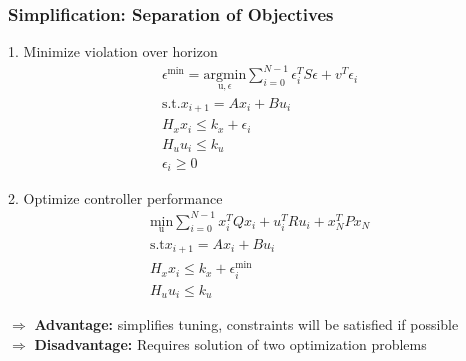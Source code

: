 \subsubsection{Simplification: Separation of Objectives}
\begin{minipage}{0.49\linewidth}
1. Minimize violation over horizon
\begin{gather*}
\epsilon^{\mathrm{min}}= \underset{\mathrm{u},\epsilon}{\mathrm{argmin}}\sum^{N-1}_{i=0} \epsilon^T_i S \epsilon + v^T \epsilon_i\\
\mathrm{s.t.} x_{i+1} = Ax_i + Bu_i\\
H_x x_i \leq k_x + \epsilon_i\\
H_u u_i \leq k_u\\
\epsilon_i \geq 0
\end{gather*}
\end{minipage}
\begin{minipage}{0.49\linewidth}
2. Optimize controller performance
\begin{gather*}
    \underset{\mathrm{u}}{\mathrm{min}}\sum^{N-1}_{i=0} x_i^T Qx_i + u_i^T R u_i + x_N^T P x_N\\
    \mathrm{s.t} x_{i+1} = Ax_i + Bu_i \\
    H_x x_i \leq k_x + \epsilon^\mathrm{min}_i\\
    H_u u_i \leq k_u
\end{gather*}
\end{minipage}
$\Rightarrow$ \textbf{Advantage:} simplifies tuning, constraints will be satisfied if possible\\
$\Rightarrow$ \textbf{Disadvantage:} Requires solution of two optimization problems
